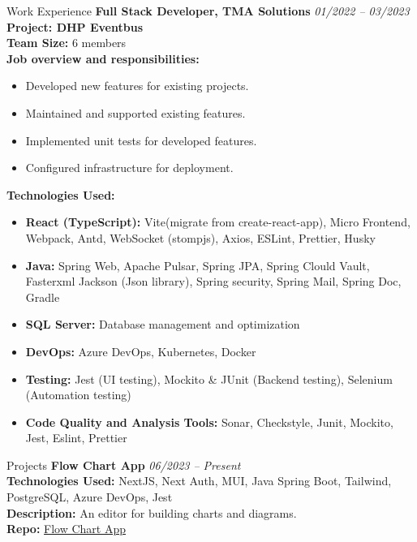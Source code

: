 \documentclass{resume} %
\begin{document}
\begin{rSection}{Work Experience}
{\bf Full Stack Developer, TMA Solutions} \hfill {\em 01/2022 – 03/2023} 
\\ \textbf{Project: DHP Eventbus}
\\ \textbf{Team Size:} 6 members
\\ \textbf{Job overview and responsibilities:}
\begin{itemize}
    \item Developed new features for existing projects.
    \item Maintained and supported existing features.
    \item Implemented unit tests for developed features.
    \item Configured infrastructure for deployment.
\end{itemize}
\textbf{Technologies Used:} 
\begin{itemize}
    \item \textbf{React (TypeScript):} Vite(migrate from create-react-app), Micro Frontend, Webpack, Antd, WebSocket (stompjs), Axios, ESLint, Prettier, Husky
    \item \textbf{Java:} Spring Web, Apache Pulsar, Spring JPA, Spring Clould Vault, Fasterxml Jackson (Json library), Spring security, Spring Mail, Spring Doc, Gradle
    \item \textbf{SQL Server:} Database management and optimization
    \item \textbf{DevOps:} Azure DevOps, Kubernetes, Docker
    \item \textbf{Testing:} Jest (UI testing), Mockito \& JUnit (Backend testing), Selenium (Automation testing)
    \item \textbf{Code Quality and Analysis Tools:} Sonar, Checkstyle, Junit, Mockito, Jest, Eslint, Prettier
\end{itemize}

\end{rSection}


\begin{rSection}{Projects}
{\bf Flow Chart App} \hfill {\em 06/2023 – Present}
\\ \textbf{Technologies Used:} NextJS, Next Auth, MUI, Java Spring Boot, Tailwind, PostgreSQL, Azure DevOps, Jest
\\ \textbf{Description:} An editor for building charts and diagrams.
\\ \textbf{Repo:} \href{https://dev.azure.com/nhattan1506/Public-Project/_git/flow-chart-app}{Flow Chart App}
\end{rSection}
\end{document}
